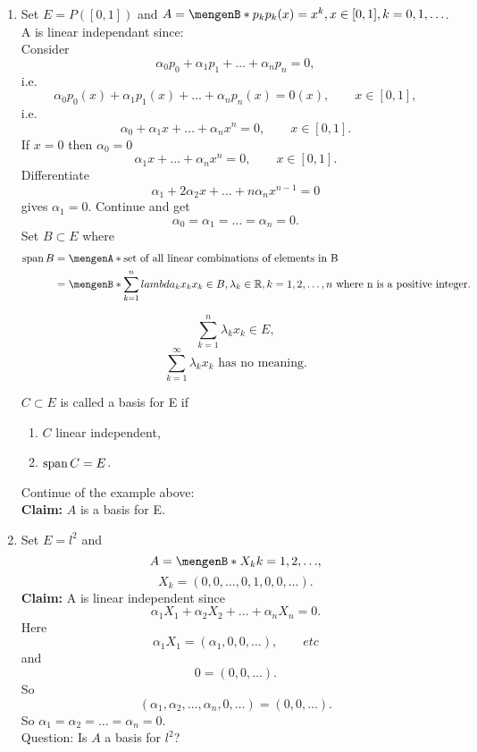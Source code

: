 	\begin{beispiele}
		\begin{enumerate}[(1)]
			\item 
		Set $E = P([0,1])$ and $A = \set[p_k]{p_k(x) = x^k, x \in [0,1], k= 0,1, \dots}$. A is linear independant since: \\ Consider
		\[
			\alpha_0 p_0 + \alpha_1 p_1 + \dots + \alpha_np_n = 0,
		\]
		i.e. 
		\[
			\alpha_0 p_0(x) + \alpha_1 p_1(x) + \dots + \alpha_n p_n(x) = 0(x), \qquad x \in [0,1], 
		\]
		i.e.
		\[
			\alpha_0 + \alpha_1 x + \dots + \alpha_n x^n = 0, \qquad x \in [0,1].
		\]
		If $x = 0$ then $\alpha_0 = 0$
		\[
			\alpha_1 x + \dots + \alpha_n x^n = 0, \qquad x \in [0,1].
		\]
		Differentiate
		\[
			\alpha_1 + 2 \alpha_2 x + \dots + n \alpha_n x^{n-1} = 0
		\]
		gives $\alpha_1 = 0$. Continue and get
		\[
			\alpha_0 = \alpha_1 = \dots = \alpha_n = 0.
		\]
		Set $B \subset E$ where
		\begin{align*}
			\spn  B &= \set{\text{set of all linear combinations of elements in B}} \\
			&= \set[\sum_{k=1}^{n}lambda_k x_k]{x_k \in B, \lambda_k \in \mathbb{R}, k=1,2,\dots,n \text{ where n is a positive integer}}.
		\end{align*}
		\begin{bemerkung}
			\[
				\sum_{k=1}^{n}\lambda_k x_k \in E,
			\]
			\[
				\sum_{k=1}^{\infty} \lambda_k x_k \text{    has no meaning}.
			\]
		\end{bemerkung}
		$C \subset E$ is called a basis for E if
		\begin{enumerate}[1)]
			\item $C$ linear independent,
			\item $ \operatorname{span}  C = E$.
		\end{enumerate}
		Continue of the example above: \\
		\textbf{Claim:} \text{    }     $A$ is a basis for E.
		\item Set $E = l^2$ and
		\[
			A = \set[X_k]{k =1,2,\dots},
		\]
		\[
			X_k = (0,0,\dots,0,1,0,0,\dots).
		\]
		\textbf{Claim:} \text{    }     A is linear independent since
		\[
			\alpha_1 X_1 + \alpha_2 X_2 + \dots + \alpha_n X_n = 0.
		\]
		Here 
		\[
			\alpha_1 X_1 = (\alpha_1,0,0,\dots), \qquad etc
		\]
		and
		\[
			0 = (0,0, \dots).
		\]
		So
		\[
			(\alpha_1,\alpha_2, \dots, \alpha_n,0, \dots) = (0,0,\dots).
		\]
		So $\alpha_1= \alpha_2 = \dots = \alpha_n = 0$. \\
		Question: Is $A$ a basis for $l^2$? \\

\end{enumerate}
\end{beispiele}
